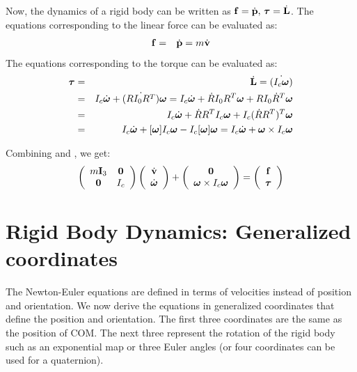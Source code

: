 Now, the dynamics of a rigid body can be written as $\mathbf{f} = \dot{\mathbf{p}} \mbox{,\ } \bm{\tau} = \dot{\mathbf{L}}$. The equations corresponding to the linear force can be evaluated as:
\begin{eqnarray}
\label{eq:force}
\mathbf{f} & = & \dot{\mathbf{p}} = m \dot{\mathbf{v}}
\end{eqnarray}
The equations corresponding to the torque can be evaluated as:
\begin{eqnarray}
\label{eq:torque}
\nonumber
\bm{\tau} & = & \dot{\mathbf{L}} = \dot{(I_c \bm{\omega})} \\
\nonumber
& = & I_c\dot{\bm{\omega}} + \dot{(RI_0 R^T)}\bm{\omega} = I_c\dot{\bm{\omega}} + \dot{R}I_0 R^T\bm{\omega} + R I_0 \dot{R}^T\bm{\omega}\\
\nonumber
& = & I_c\dot{\bm{\omega}} + \dot{R}R^T I_c \bm{\omega} + I_c (\dot{R}R^T)^T\bm{\omega} \\
& = & I_c\dot{\bm{\omega}} + [\bm{\omega}]I_c \bm{\omega} - I_c[\bm{\omega}]\bm{\omega} = I_c\dot{\bm{\omega}} + \bm{\omega} \times I_c \bm{\omega}
\end{eqnarray}

Combining  and , we get:
\begin{equation}
\label{eq:newtoneuler}
\left(
\begin{array}{cc}
m\mathbf{I}_3 & \mathbf{0} \\
\mathbf{0} & I_c 
\end{array}
\right)
\left(
\begin{array}{c}
\dot{\mathbf{v}} \\
\dot{\bm{\omega}} 
\end{array}
\right) +
\left(
\begin{array}{c}
\mathbf{0}  \\
\bm{\omega} \times I_c \bm{\omega} 
\end{array}
\right) = 
\left(
\begin{array}{c}
\mathbf{f} \\
\bm{\tau} 
\end{array}
\right)
\end{equation}

\newpage
\section{Rigid Body Dynamics: Generalized coordinates}
\label{sec:rigidbodydyngen}
The Newton-Euler equations are defined in terms of velocities instead of position and orientation. We now derive the equations in generalized coordinates  that define the position and orientation. The first three coordinates are the same as the position of COM. The next three represent the rotation of the rigid body such as an exponential map or three Euler angles (or four coordinates can be used for a quaternion).

